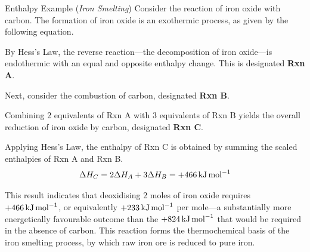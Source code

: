 \documentclass[10pt]{article}
\begin{document}
    \begin{core}{Enthalpy Example (\textit{Iron Smelting})}
      Consider the reaction of iron oxide with carbon. The formation of iron oxide is an exothermic process, as given by the following equation.


      By Hess's Law, the reverse reaction---the decomposition of iron oxide---is endothermic with an equal and opposite enthalpy change. This is designated \textbf{Rxn A}.


      Next, consider the combustion of carbon, designated \textbf{Rxn B}.


      Combining 2 equivalents of Rxn A with 3 equivalents of Rxn B yields the overall reduction of iron oxide by carbon, designated \textbf{Rxn C}.


      Applying Hess's Law, the enthalpy of Rxn C is obtained by summing the scaled enthalpies of Rxn A and Rxn B.
      \[
        \Delta H_C = 2\Delta H_A + 3\Delta H_B = +466\,\text{kJ\,mol}^{-1}
      \]

      This result indicates that deoxidising 2 moles of iron oxide requires $+466\,\text{kJ\,mol}^{-1}$, or equivalently $+233\,\text{kJ\,mol}^{-1}$ per mole---a substantially more energetically favourable outcome than the $+824\,\text{kJ\,mol}^{-1}$ that would be required in the absence of carbon. This reaction forms the thermochemical basis of the iron smelting process, by which raw iron ore is reduced to pure iron.

    \end{core}
    
\end{document}
